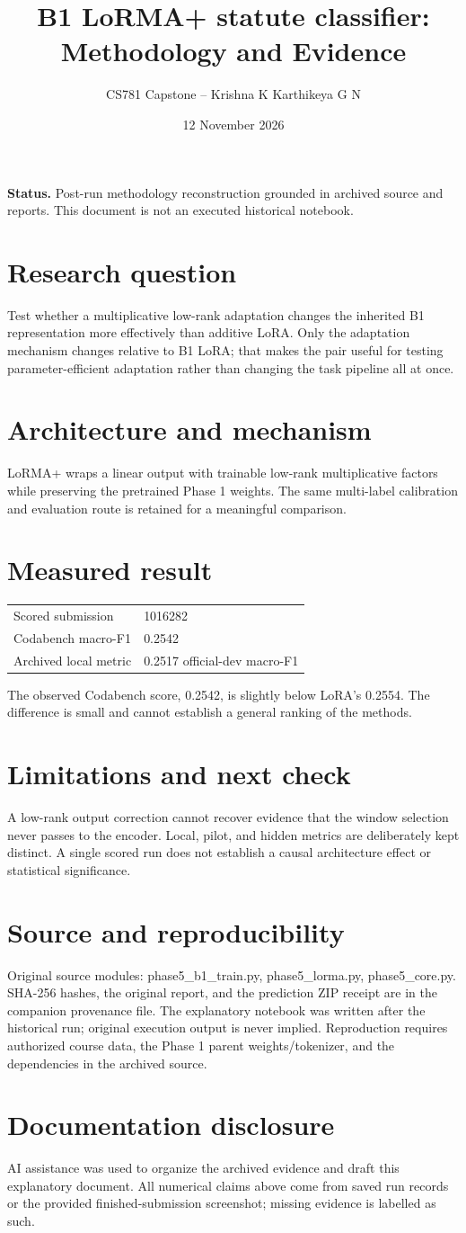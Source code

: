 \documentclass[11pt,a4paper]{article}
\title{B1 LoRMA+ statute classifier: Methodology and Evidence}
\author{CS781 Capstone -- Krishna K Karthikeya G N}
\date{12 November 2026}
\begin{document}
\maketitle
\noindent\textbf{Status.} Post-run methodology reconstruction grounded in archived source and reports. This document is not an executed historical notebook.\par
\section*{Research question}
Test whether a multiplicative low-rank adaptation changes the inherited B1 representation more effectively than additive LoRA. Only the adaptation mechanism changes relative to B1 LoRA; that makes the pair useful for testing parameter-efficient adaptation rather than changing the task pipeline all at once.
\section*{Architecture and mechanism}
LoRMA+ wraps a linear output with trainable low-rank multiplicative factors while preserving the pretrained Phase 1 weights. The same multi-label calibration and evaluation route is retained for a meaningful comparison.
\section*{Measured result}
\begin{center}\begin{tabular}{ll}Scored submission & 1016282\\
Codabench macro-F1 & 0.2542\\
Archived local metric & 0.2517 official-dev macro-F1\end{tabular}\end{center}
The observed Codabench score, 0.2542, is slightly below LoRA's 0.2554. The difference is small and cannot establish a general ranking of the methods.
\section*{Limitations and next check}
A low-rank output correction cannot recover evidence that the window selection never passes to the encoder. Local, pilot, and hidden metrics are deliberately kept distinct. A single scored run does not establish a causal architecture effect or statistical significance.
\section*{Source and reproducibility}
Original source modules: phase5\_b1\_train.py, phase5\_lorma.py, phase5\_core.py. SHA-256 hashes, the original report, and the prediction ZIP receipt are in the companion provenance file. The explanatory notebook was written after the historical run; original execution output is never implied. Reproduction requires authorized course data, the Phase 1 parent weights/tokenizer, and the dependencies in the archived source.
\section*{Documentation disclosure}
AI assistance was used to organize the archived evidence and draft this explanatory document. All numerical claims above come from saved run records or the provided finished-submission screenshot; missing evidence is labelled as such.
\end{document}
